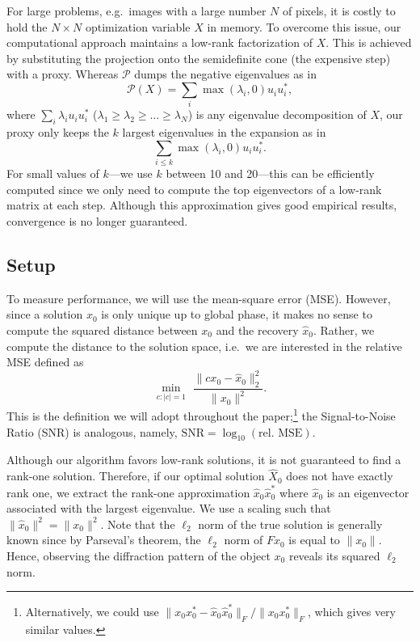 \documentclass[11pt]{article}
\newcommand{\<}{\langle}
\renewcommand{\>}{\rangle}
\numberwithin{equation}{section}
\begin{document}
For large problems, e.g.~images with a large number $N$ of pixels, it
is costly to hold the $N \times N$ optimization variable $X$ in
memory. To overcome this issue, our computational approach maintains a
low-rank factorization of $X$. This is achieved by substituting the
projection onto the semidefinite cone (the expensive step) with a
proxy. Whereas $\mathcal{P}$ dumps the negative eigenvalues as in
\[
\mathcal{P}(X) = \sum_i \max(\lambda_i,0) u_i u_i^*,
\]
where $\sum_i \lambda_i u_i u_i^*$ ($\lambda_1 \ge \lambda_2 \ge
\ldots \ge \lambda_N$) is any eigenvalue decomposition of $X$, our
proxy only keeps the $k$ largest eigenvalues in the expansion as in
\[
\sum_{i \le k} \max(\lambda_i,0) u_i u_i^*.
\]
For small values of $k$---we use $k$ between 10 and 20---this can be
efficiently computed since we only need to compute the top
eigenvectors of a low-rank matrix at each step. Although this
approximation gives good empirical results, convergence is no longer
guaranteed.

\subsection{Setup}

To measure performance, we will use the mean-square error
(MSE). However, since a solution $x_0$ is only unique up to global
phase, it makes no sense to compute the squared distance between $x_0$
and the recovery $\hat{x}_0$.  Rather, we compute the distance to the
solution space, i.e.~we are interested in the relative MSE
defined as 
\[
\min_{c : |c| = 1} \,\, \frac{\|c x_0 - \hat{x}_0\|_2^2}{\|x_0\|^2}.
\]
This is the definition we will adopt throughout the
paper;\footnote{Alternatively, we could use $\|x_0 x_0^* - \hat{x}_0
  \hat{x}_0^*\|_F/\|x_0 x_0^*\|_F$, which gives very similar values.}
the Signal-to-Noise Ratio (SNR) is analogous, namely, $\text{SNR} =
\log_{10} (\text{rel.~MSE})$.

Although our algorithm favors low-rank solutions, it is not guaranteed
to find a rank-one solution.  Therefore, if our optimal solution
$\hat{X}_0$ does not have exactly rank one, we extract the rank-one
approximation $\hat{x}_0 \hat{x}_0^*$ where $\hat{x}_0$ is an
eigenvector associated with the largest eigenvalue. We use a scaling
such that $\|\hat{x}_0\|^2 = \|x_0\|^2$. Note that the $\ell_2$ norm
of the true solution is generally known since by Parseval's theorem,
the $\ell_2$ norm of $F x_0$ is equal to $\|x_0\|$. Hence, observing
the diffraction pattern of the object $x_0$ reveals its squared
$\ell_2$ norm.
\end{document}
